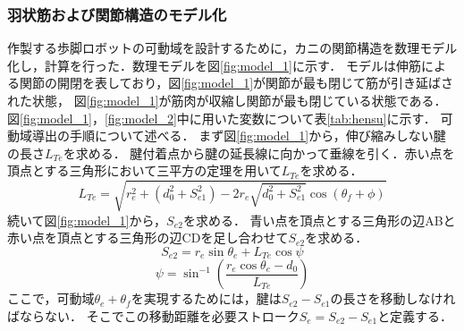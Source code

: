 \subsubsection{羽状筋および関節構造のモデル化}
作製する歩脚ロボットの可動域を設計するために，カニの関節構造を数理モデル化し，計算を行った．数理モデルを図\ref{fig:model_1}に示す．
モデルは伸筋による関節の開閉を表しており，図\ref{fig:model_1}が関節が最も閉じて筋が引き延ばされた状態，
図\ref{fig:model_1}が筋肉が収縮し関節が最も閉じている状態である．
図\ref{fig:model_1}，\ref{fig:model_2}中に用いた変数について表\ref{tab:hensu}に示す．
可動域導出の手順について述べる．
まず図\ref{fig:model_1}から，伸び縮みしない腱の長さ$L_{Te}$を求める．
腱付着点から腱の延長線に向かって垂線を引く．赤い点を頂点とする三角形において三平方の定理を用いて$L_{Te}$を求める．
\begin{equation}
  L_{Te} = \sqrt{r_e^2 + (d_0^2 + S_{e1}^2) - 2r_e\sqrt{d_0^2 + S_{e1}^2}\cos (\theta_f + \phi ) } 
\end{equation}
続いて図\ref{fig:model_1}から，$S_{e2}$を求める．
青い点を頂点とする三角形の辺ABと赤い点を頂点とする三角形の辺CDを足し合わせて$S_{e2}$を求める．
\begin{equation}
  S_{e2} = r_e\sin \theta_e + L_{Te}\cos \psi  
\end{equation}
\begin{equation}
  \psi  = \sin^{-1}\left({\dfrac{r_e \cos \theta_e - d_0}{L_{Te}}}\right)
\end{equation}
ここで，可動域$\theta_e + \theta_f$を実現するためには，腱は$S_{e2} - S_{e1}$の長さを移動しなければならない．
そこでこの移動距離を必要ストローク$S_e = S_{e2} - S_{e1}$と定義する．

